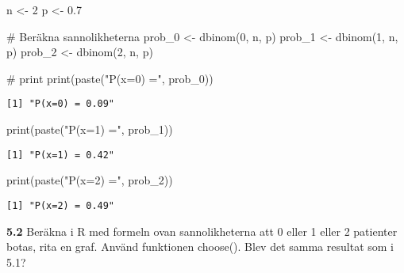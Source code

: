 \documentclass[
  letterpaper,
  DIV=11,
  numbers=noendperiod]{scrartcl}
\newenvironment{Shaded}{\begin{snugshade}}{\end{snugshade}}
\newcommand{\CommentTok}[1]{\textcolor[rgb]{0.37,0.37,0.37}{#1}}
\newcommand{\DecValTok}[1]{\textcolor[rgb]{0.68,0.00,0.00}{#1}}
\newcommand{\FloatTok}[1]{\textcolor[rgb]{0.68,0.00,0.00}{#1}}
\newcommand{\FunctionTok}[1]{\textcolor[rgb]{0.28,0.35,0.67}{#1}}
\newcommand{\NormalTok}[1]{\textcolor[rgb]{0.00,0.23,0.31}{#1}}
\newcommand{\OtherTok}[1]{\textcolor[rgb]{0.00,0.23,0.31}{#1}}
\newcommand{\StringTok}[1]{\textcolor[rgb]{0.13,0.47,0.30}{#1}}
\begin{document}
\begin{Shaded}
\begin{Highlighting}[]
\NormalTok{n }\OtherTok{\textless{}{-}} \DecValTok{2}
\NormalTok{p }\OtherTok{\textless{}{-}} \FloatTok{0.7}

\CommentTok{\# Beräkna sannolikheterna}
\NormalTok{prob\_0 }\OtherTok{\textless{}{-}} \FunctionTok{dbinom}\NormalTok{(}\DecValTok{0}\NormalTok{, n, p)}
\NormalTok{prob\_1 }\OtherTok{\textless{}{-}} \FunctionTok{dbinom}\NormalTok{(}\DecValTok{1}\NormalTok{, n, p)}
\NormalTok{prob\_2 }\OtherTok{\textless{}{-}} \FunctionTok{dbinom}\NormalTok{(}\DecValTok{2}\NormalTok{, n, p)}

\CommentTok{\# print}
\FunctionTok{print}\NormalTok{(}\FunctionTok{paste}\NormalTok{(}\StringTok{"P(x=0) ="}\NormalTok{, prob\_0))}
\end{Highlighting}
\end{Shaded}

\begin{verbatim}
[1] "P(x=0) = 0.09"
\end{verbatim}

\begin{Shaded}
\begin{Highlighting}[]
\FunctionTok{print}\NormalTok{(}\FunctionTok{paste}\NormalTok{(}\StringTok{"P(x=1) ="}\NormalTok{, prob\_1))}
\end{Highlighting}
\end{Shaded}

\begin{verbatim}
[1] "P(x=1) = 0.42"
\end{verbatim}

\begin{Shaded}
\begin{Highlighting}[]
\FunctionTok{print}\NormalTok{(}\FunctionTok{paste}\NormalTok{(}\StringTok{"P(x=2) ="}\NormalTok{, prob\_2))}
\end{Highlighting}
\end{Shaded}

\begin{verbatim}
[1] "P(x=2) = 0.49"
\end{verbatim}

\textbf{5.2} Beräkna i R med formeln ovan sannolikheterna att 0 eller 1
eller 2 patienter botas, rita en graf. Använd funktionen choose(). Blev
det samma resultat som i 5.1?
\end{document}
